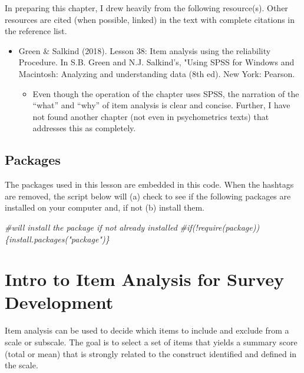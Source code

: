 \documentclass[
  english,
]{book}
\newenvironment{Shaded}{\begin{snugshade}}{\end{snugshade}}
\newcommand{\CommentTok}[1]{\textcolor[rgb]{0.56,0.35,0.01}{\textit{#1}}}
\providecommand{\tightlist}{%
  \setlength{\itemsep}{0pt}\setlength{\parskip}{0pt}}
\begin{document}
In preparing this chapter, I drew heavily from the following resource(s). Other resources are cited (when possible, linked) in the text with complete citations in the reference list.

\begin{itemize}
\tightlist
\item
  Green \& Salkind (2018). Lesson 38: Item analysis using the reliability Procedure. In S.B. Green and N.J. Salkind's, "Using SPSS for Windows and Macintosh: Analyzing and understanding data (8th ed). New York: Pearson.

  \begin{itemize}
  \tightlist
  \item
    Even though the operation of the chapter uses SPSS, the narration of the ``what'' and ``why'' of item analysis is clear and concise. Further, I have not found another chapter (not even in psychometrics texts) that addresses this as completely.
  \end{itemize}
\end{itemize}

\hypertarget{packages-3}{%
\subsection{Packages}\label{packages-3}}

The packages used in this lesson are embedded in this code. When the hashtags are removed, the script below will (a) check to see if the following packages are installed on your computer and, if not (b) install them.

\begin{Shaded}
\begin{Highlighting}[]
\CommentTok{\#will install the package if not already installed}
\CommentTok{\#if(!require(package))\{install.packages("package")\}}
\end{Highlighting}
\end{Shaded}

\hypertarget{intro-to-item-analysis-for-survey-development}{%
\section{Intro to Item Analysis for Survey Development}\label{intro-to-item-analysis-for-survey-development}}

Item analysis can be used to decide which items to include and exclude from a scale or subscale. The goal is to select a set of items that yields a summary score (total or mean) that is strongly related to the construct identified and defined in the scale.
\end{document}

